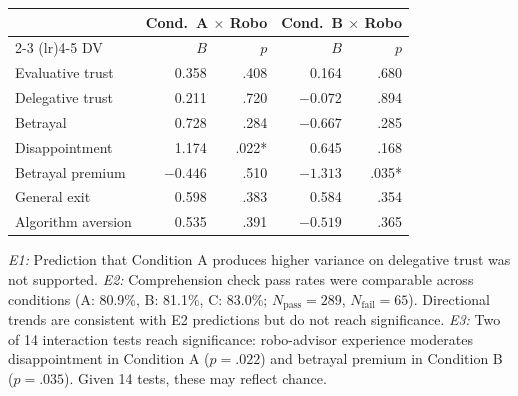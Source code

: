\begin{table}[H]
\begin{threeparttable}
\begin{small}
\medskip
\begin{tabular}{lrrrr}
\toprule
 & \multicolumn{2}{c}{Cond.\ A $\times$ Robo} & \multicolumn{2}{c}{Cond.\ B $\times$ Robo} \\
\cmidrule(lr){2-3} \cmidrule(lr){4-5}
DV & $B$ & $p$ & $B$ & $p$ \\
\midrule
Evaluative trust   &  0.358 & .408 &  0.164 & .680 \\
Delegative trust   &  0.211 & .720 & $-0.072$ & .894 \\
Betrayal           &  0.728 & .284 & $-0.667$ & .285 \\
Disappointment     &  1.174 & .022* &  0.645 & .168 \\
Betrayal premium   & $-0.446$ & .510 & $-1.313$ & .035* \\
General exit       &  0.598 & .383 &  0.584 & .354 \\
Algorithm aversion &  0.535 & .391 & $-0.519$ & .365 \\
\bottomrule
\end{tabular}
\end{small}
\begin{tablenotes}
\small
\item \textit{E1:} Prediction that Condition A produces higher variance on delegative trust was not supported. \textit{E2:} Comprehension check pass rates were comparable across conditions (A: 80.9\%, B: 81.1\%, C: 83.0\%; $N_\text{pass} = 289$, $N_\text{fail} = 65$). Directional trends are consistent with E2 predictions but do not reach significance. \textit{E3:} Two of 14 interaction tests reach significance: robo-advisor experience moderates disappointment in Condition A ($p = .022$) and betrayal premium in Condition B ($p = .035$). Given 14 tests, these may reflect chance.
\end{tablenotes}
\end{threeparttable}
\end{table}
